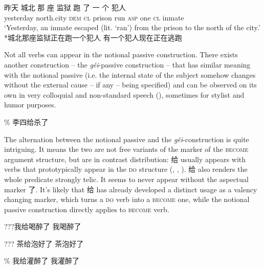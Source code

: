\documentclass[UTF8, a4paper, oneside, scheme=plain, 12pt]{ctexrep}
\newcommand{\form}[1]{\emph{#1}}
\newcommand{\translate}[1]{`#1'}
\newcommand*{\category}[1]{\textsc{#1}}
\begin{document}
\begin{exe}
    \ex\label{ex:verb-phrase.overview.1} \gll 昨天 城北 那 座 监狱 跑 了 一 个 犯人 \\
    yesterday north.city \category{dem} \category{cl} prison run \category{asp} one \category{cl} inmate \\
    \glt \translate{Yesterday, an inmate escaped (lit. `ran') from the prison to the north of the city.} 
    \ex\label{ex:verb-phrase.overview.2} *城北那座监狱正在跑一个犯人
    \ex\label{ex:verb-phrase.overview.3} 有一个犯人现在正在逃跑
\end{exe}

Not all verbs can appear in the notional passive construction.
There exists another construction -- the \form{gěi}-passive construction -- 
that has similar meaning with the notional passive
(i.e. the internal state of the subject somehow changes 
without the external cause -- if any -- being specified) and
can be observed on its own 
in very colloquial and non-standard speech
(),
sometimes for stylist and humor purposes.

\begin{exe}
    \ex\label{ex:verb-phrase.gei.1} \% 李四给杀了
\end{exe}

The alternation between the notional passive and the \form{gěi}-construction 
is quite intriguing.
It means the two are not free variants of the marker of the \category{become} argument structure,
but are in contrast distribution:
给 usually appears with verbs that prototypically appear in the \category{do} structure
(,
,
).
给 also renders the whole predicate strongly telic.
It seems to never appear without the aspectual marker 了.
It's likely that 给 has already developed a distinct usage 
as a valency changing marker, 
which turns a \category{do} verb into a \category{become} one,
while the notional passive construction directly applies to \category{become} verb.

\begin{exe}
    \ex\label{ex:verb-phrase.gei.alternation-1} \begin{xlist}
        \ex ???我给喝醉了
        \ex 我喝醉了
    \end{xlist}
    \ex\label{ex:verb-phrase.gei.alternation-2} \begin{xlist}
        \ex ??? 茶给泡好了
        \ex 茶泡好了
    \end{xlist}
    \ex\label{ex:verb-phrase.gei.alternation-3} \begin{xlist}
        \ex \% 我给灌醉了
        \ex *我灌醉了
    \end{xlist}
\end{exe}
\end{document}
